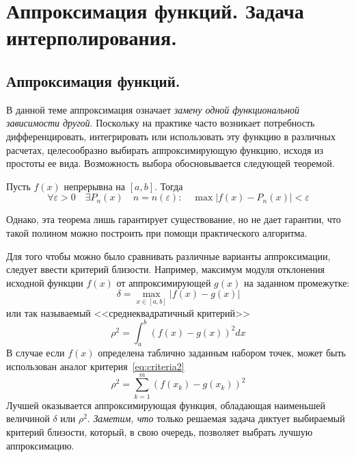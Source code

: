 \section{Аппроксимация функций. Задача интерполирования.}\label{sec:ch05}

\subsection{Аппроксимация функций.}
В данной теме аппроксимация означает \emph{замену одной функциональной зависимости другой}. Поскольку на практике часто
возникает потребность дифференцировать, интегрировать или использовать эту функцию в различных расчетах, целесообразно
выбирать аппроксимирующую функцию, исходя из простоты ее вида. Возможность выбора обосновывается следующей теоремой.
\begin{theorem}
    Пусть $f(x)$ непрерывна на $[a, b]$. Тогда
    \begin{equation*}
        \forall \varepsilon > 0 \quad \exists P_n(x) \quad n = n(\varepsilon) : \quad \max |f(x) - P_n(x)| < \varepsilon
    \end{equation*}
\end{theorem}
Однако, эта теорема лишь гарантирует существование, но не дает гарантии, что такой полином можно построить при помощи
практического алгоритма.

Для того чтобы можно было сравнивать различные варианты аппроксимации, следует ввести критерий близости. Например,
максимум модуля отклонения исходной функции $f(x)$ от аппроксимирующей $g(x)$ на заданном промежутке:
\begin{equation}
    \delta = \max_{x \in [a, b]} |f(x) - g(x)|\label{eq:criteria1}
\end{equation}
или так называемый <<среднеквадратичный критерий>>
\begin{equation}
    \rho^2 = \int_a^b \left( f(x) - g(x) \right)^2 dx\label{eq:criteria2}
\end{equation}
В случае если $f(x)$ определена таблично заданным набором точек, может быть использован аналог
критерия~\eqref{eq:criteria2}
\begin{equation}
    \rho^2 = \sum_{k=1}^m \left( f(x_k) - g(x_k) \right)^2\label{eq:criteria3}
\end{equation}
Лучшей оказывается аппроксимирующая функция, обладающая наименьшей величиной $\delta$ или $\rho^2$. \emph{Заметим, что} только
решаемая задача диктует выбираемый критерий близости, который, в свою очередь, позволяет выбрать лучшую аппроксимацию.

